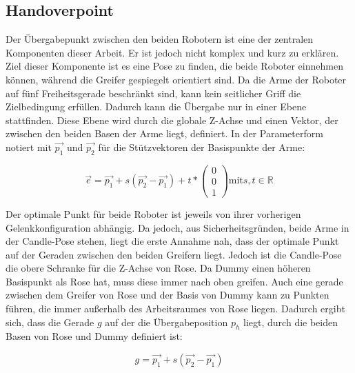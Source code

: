 \subsection{Handoverpoint}
\label{sec:impl-hop}
Der Übergabepunkt zwischen den beiden Robotern ist eine der zentralen Komponenten dieser Arbeit. Er ist jedoch nicht komplex und kurz zu erklären. Ziel dieser Komponente ist es eine Pose zu finden, die beide Roboter einnehmen können, während die Greifer gespiegelt orientiert sind. Da die Arme der Roboter auf fünf Freiheitsgerade beschränkt sind, kann kein seitlicher Griff die Zielbedingung erfüllen. Dadurch kann die Übergabe nur in einer Ebene stattfinden. Diese Ebene wird durch die globale Z-Achse und einen Vektor, der zwischen den beiden Basen der Arme liegt, definiert. In der Parameterform notiert mit $\overrightarrow{p_1}$ und $\overrightarrow{p_2}$ für die Stützvektoren der Basispunkte der Arme:

\begin{equation}
\overrightarrow{e} = \overrightarrow{p_1} + s(\overrightarrow{p_2} - \overrightarrow{p_1}) + t*\left(\begin{array}{c} 0 \\ 0 \\ 1 \end{array}\right) \text{mit} s,t \in \mathbb{R}
\end{equation}

Der optimale Punkt für beide Roboter ist jeweils von ihrer vorherigen Gelenkkonfiguration abhängig. Da jedoch, aus Sicherheitsgründen, beide Arme in der Candle-Pose stehen, liegt die erste Annahme nah, dass der optimale Punkt auf der Geraden zwischen den beiden Greifern liegt. Jedoch ist die Candle-Pose die obere Schranke für die Z-Achse von Rose. Da Dummy einen höheren Basispunkt als Rose hat, muss diese immer nach oben greifen. Auch eine gerade zwischen dem Greifer von Rose und der Basis von Dummy kann zu Punkten führen, die immer außerhalb des Arbeitsraumes von Rose liegen. Dadurch ergibt sich, dass die Gerade $g$ auf der die Übergabeposition $p_h$ liegt, durch die beiden Basen von Rose und Dummy definiert ist:

\begin{equation}
g = \overrightarrow{p_1} + s(\overrightarrow{p_2} - \overrightarrow{p_1})
\end{equation}

